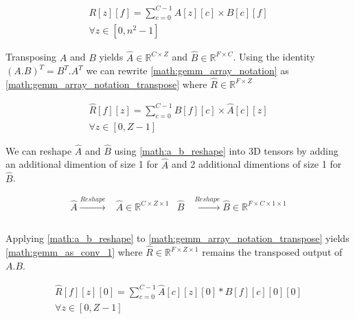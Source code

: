 \begin{equation}
    \begin{aligned}
        R[z][f] = \displaystyle\sum\limits_{c=0}^{C-1}A[z][c]\times B[c][f] \\ \forall z\in[0, n^2-1]
    \end{aligned}
    \label{math:gemm_array_notation}
\end{equation}

Transposing $A$ and $B$ yields $\hat{A} \in \mathbb{R}^{C\times Z}$ and $\hat{B} \in
\mathbb{R}^{F\times C}$. Using the identity $(A.B)^T = B^T.A^T$ we can rewrite
\autoref{math:gemm_array_notation} as
\autoref{math:gemm_array_notation_transpose} where $\hat{R} \in
\mathbb{R}^{F\times Z}$

\begin{equation}
    \begin{aligned}
        \hat{R}[f][z] = \displaystyle\sum\limits_{c=0}^{C-1}\hat{B}[f][c]\times \hat{A}[c][z] \\ \forall z\in[0, Z-1]
    \end{aligned}
    \label{math:gemm_array_notation_transpose}
\end{equation}

We can reshape $\hat{A}$ and $\hat{B}$ using \autoref{math:a_b_reshape} into 3D
tensors by adding an additional dimention of size 1 for $\hat{A}$ and 2
additional dimentions of size 1 for $\hat{B}$.

\begin{equation}
    \begin{aligned}
        \hat{A} \xrightarrow[]{Reshape} &\hat{A}  \in \mathbb{R}^{C \times Z\times 1}   &\hat{B} & \xrightarrow[]{Reshape} \hat{B}  \in \mathbb{R}^{F \times C\times 1\times 1} \\
    \end{aligned}
    \label{math:a_b_reshape}
\end{equation}

Applying \autoref{math:a_b_reshape} to
\autoref{math:gemm_array_notation_transpose} yields
\autoref{math:gemm_as_conv_1} where $\hat{R} \in \mathbb{R}^{F \times Z\times 1}
$ remains the transposed output of $A.B$. 

\begin{equation}
    \begin{aligned}
        \hat{R}[f][z][0] = \displaystyle\sum\limits_{c=0}^{C-1}\hat{A}[c][z][0]*\hat{B}[f][c][0][0] \\ \forall z \in [0, Z-1] 
        \end{aligned}
    \label{math:gemm_as_conv_1}
\end{equation}

